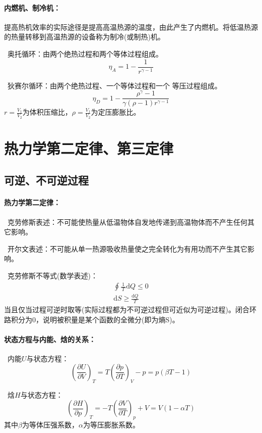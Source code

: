 \documentclass[zihao=-4,UTF8]{report}
\begin{document}
\subsubsection{内燃机、制冷机：}
提高热机效率的实际途径是提高高温热源的温度，由此产生了内燃机。将低温热源的热量转移到高温热源的设备称为制冷(或制热)机。\par
{}\ 奥托循环：由两个绝热过程和两个等体过程组成。
\begin{equation*}
    \eta_A = 1 - \frac{1}{r^{\gamma -1}}
\end{equation*}

\par
{}\ 狄赛尔循环：由两个绝热过程、一个等体过程和一个 等压过程组成。
\begin{equation*}
    \eta_D =1- \frac{\rho^{\gamma} -1}{\gamma(\rho -1) r^{\gamma -1}}
\end{equation*}
{\color{gray}\small $r = \frac{V_1}{V_2}$为体积压缩比，$\rho = \frac{V_1}{V_2}$为定压膨胀比。}
\chapter{热力学第二定律、第三定律}
\section{可逆、不可逆过程}
\subsubsection{热力学第二定律：}
\ 克劳修斯表述：不可能使热量从低温物体自发地传递到高温物体而不产生任何其它影响。\par
{}\ 开尔文表述：不可能从单一热源吸收热量使之完全转化为有用功而不产生其它影响。\par
{}\ 克劳修斯不等式(数学表述)：
\begin{gather}
    \oint \frac{1}{\, T\, }\mathrm{d}Q \le 0\\
    \mathrm{d}S \ge \frac{\mathrm{d}Q}{T}
\end{gather}
{\color{gray}\small 当且仅当过程可逆时取等(实际过程都为不可逆过程但可近似为可逆过程)。闭合环路积分为0，说明被积量是某个函数的全微分(即为熵S)。}

\subsubsection{状态方程与内能、焓的关系：}
\ 内能$U$与状态方程：
\begin{equation}
    \left(\frac{\partial U}{\partial V} \right)_T = T \left(\frac{\partial p}{\partial T}\right)_V - p =p\left(\beta T -1\right)
\end{equation}
\par
{}\ 焓$H$与状态方程：
\begin{equation}
    \left(\frac{\partial H}{\partial p} \right)_T = -T \left(\frac{\partial V}{\partial T}\right)_p + V = V\left( 1- \alpha T\right)
\end{equation}
{\color{gray}\small 其中$\beta$为等体压强系数，$\alpha $为等压膨胀系数。}
\end{document}
